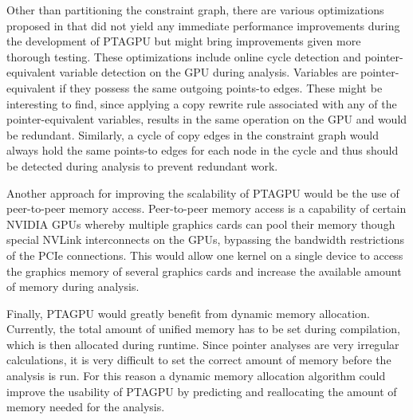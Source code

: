 Other than partitioning the constraint graph, there are various optimizations proposed in \cite{mendez2012gpu} that did not yield any immediate performance improvements during the development of PTAGPU but might bring improvements given more thorough testing.
These optimizations include online cycle detection and pointer-equivalent variable detection on the GPU during analysis.
Variables are pointer-equivalent if they possess the same outgoing points-to edges. These might be interesting to find, since applying a copy rewrite rule associated with any of the pointer-equivalent variables, results in the same operation on the GPU and would be redundant.
Similarly, a cycle of copy edges in the constraint graph would always hold the same points-to edges for each node in the cycle and thus should be detected during analysis to prevent redundant work.

Another approach for improving the scalability of PTAGPU would be the use of peer-to-peer memory access.
Peer-to-peer memory access is a capability of certain NVIDIA GPUs whereby multiple graphics cards can pool their memory though special NVLink interconnects on the GPUs, bypassing the bandwidth restrictions of the PCIe connections.
This would allow one kernel on a single device to access the graphics memory of several graphics cards and increase the available amount of memory during analysis.

Finally, PTAGPU would greatly benefit from dynamic memory allocation. Currently, the total amount of unified memory has to be set during compilation, which is then allocated during runtime.
Since pointer analyses are very irregular calculations, it is very difficult to set the correct amount of memory before the analysis is run.
For this reason a dynamic memory allocation algorithm could improve the usability of PTAGPU by predicting and reallocating the amount of memory needed for the analysis.

